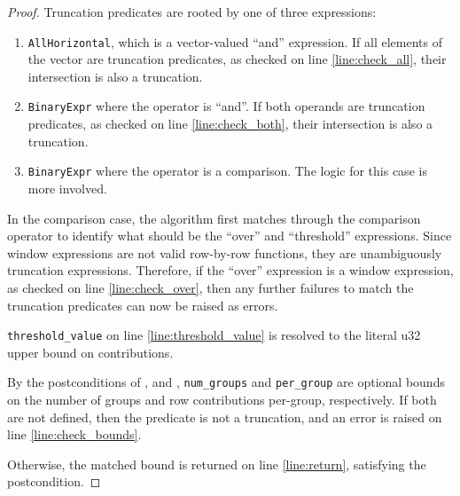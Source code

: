 \documentclass{article}
\begin{document}
\begin{proof}
    Truncation predicates are rooted by one of three expressions:
    \begin{enumerate}
        \item \texttt{AllHorizontal}, which is a vector-valued ``and'' expression. If all elements of the vector are truncation predicates,
        as checked on line \ref{line:check_all}, their intersection is also a truncation.
        \item \texttt{BinaryExpr} where the operator is ``and''. If both operands are truncation predicates,
        as checked on line \ref{line:check_both}, their intersection is also a truncation.
        \item \texttt{BinaryExpr} where the operator is a comparison. The logic for this case is more involved.
    \end{enumerate}

    In the comparison case, the algorithm first matches through the comparison operator 
    to identify what should be the ``over'' and ``threshold'' expressions.
    Since window expressions are not valid row-by-row functions,
    they are unambiguously truncation expressions.
    Therefore, if the ``over'' expression is a window expression, as checked on line \ref{line:check_over},
    then any further failures to match the truncation predicates can now be raised as errors.

    \texttt{threshold\_value} on line \ref{line:threshold_value} is resolved to the literal u32 upper bound on contributions.
    
    By the postconditions of ,
    and ,
    \texttt{num\_groups} and \texttt{per\_group} are optional bounds on the number of groups and row contributions per-group, respectively.
    If both are not defined, then the predicate is not a truncation,
    and an error is raised on line \ref{line:check_bounds}.

    Otherwise, the matched bound is returned on line \ref{line:return}, satisfying the postcondition.
\end{proof}
\end{document}
